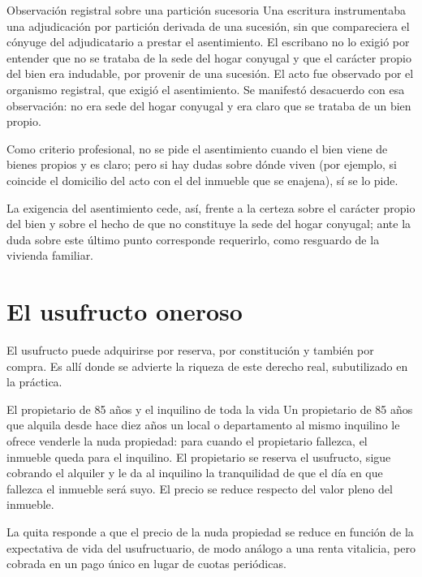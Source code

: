 \documentclass[12pt,oneside]{book}
\begin{document}
\begin{example}{Observación registral sobre una partición sucesoria}
Una escritura instrumentaba una adjudicación por partición derivada de una sucesión, sin que compareciera el cónyuge del adjudicatario a prestar el asentimiento. El escribano no lo exigió por entender que no se trataba de la sede del hogar conyugal y que el carácter propio del bien era indudable, por provenir de una sucesión. El acto fue observado por el organismo registral, que exigió el asentimiento. Se manifestó desacuerdo con esa observación: no era sede del hogar conyugal y era claro que se trataba de un bien propio.

Como criterio profesional, no se pide el asentimiento cuando el bien viene de bienes propios y es claro; pero si hay dudas sobre dónde viven (por ejemplo, si coincide el domicilio del acto con el del inmueble que se enajena), sí se lo pide.
\end{example}

La exigencia del asentimiento cede, así, frente a la certeza sobre el carácter propio del bien y sobre el hecho de que no constituye la sede del hogar conyugal; ante la duda sobre este último punto corresponde requerirlo, como resguardo de la vivienda familiar.

\section{El usufructo oneroso}
\label{sec:oneroso}

El usufructo puede adquirirse por reserva, por constitución y también por compra. Es allí donde se advierte la riqueza de este derecho real, subutilizado en la práctica.

\begin{example}{El propietario de 85 años y el inquilino de toda la vida}
Un propietario de 85 años que alquila desde hace diez años un local o departamento al mismo inquilino le ofrece venderle la nuda propiedad: para cuando el propietario fallezca, el inmueble queda para el inquilino. El propietario se reserva el usufructo, sigue cobrando el alquiler y le da al inquilino la tranquilidad de que el día en que fallezca el inmueble será suyo. El precio se reduce respecto del valor pleno del inmueble.

La quita responde a que el precio de la nuda propiedad se reduce en función de la expectativa de vida del usufructuario, de modo análogo a una renta vitalicia, pero cobrada en un pago único en lugar de cuotas periódicas.
\end{example}
\end{document}
